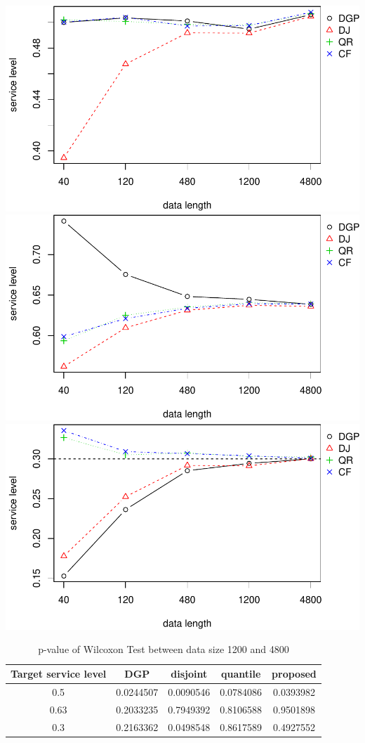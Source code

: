 \documentclass[
]{article}
\begin{document}
\includegraphics{linear-norm-plot_files/figure-latex/sl-1.pdf}
\includegraphics{linear-norm-plot_files/figure-latex/sl-2.pdf}
\includegraphics{linear-norm-plot_files/figure-latex/sl-3.pdf}

\begin{table}

\caption{\label{tab:Wilcoxon}p-value of Wilcoxon Test between data size 1200 and 4800}
\centering
\begin{tabular}[t]{ccccc}
\toprule
Target service level & DGP & disjoint & quantile & proposed\\
\midrule
\rowcolor{gray!6}  0.5 & 0.0244507 & 0.0090546 & 0.0784086 & 0.0393982\\
0.63 & 0.2033235 & 0.7949392 & 0.8106588 & 0.9501898\\
\rowcolor{gray!6}  0.3 & 0.2163362 & 0.0498548 & 0.8617589 & 0.4927552\\
\bottomrule
\end{tabular}
\end{table}
\end{document}
